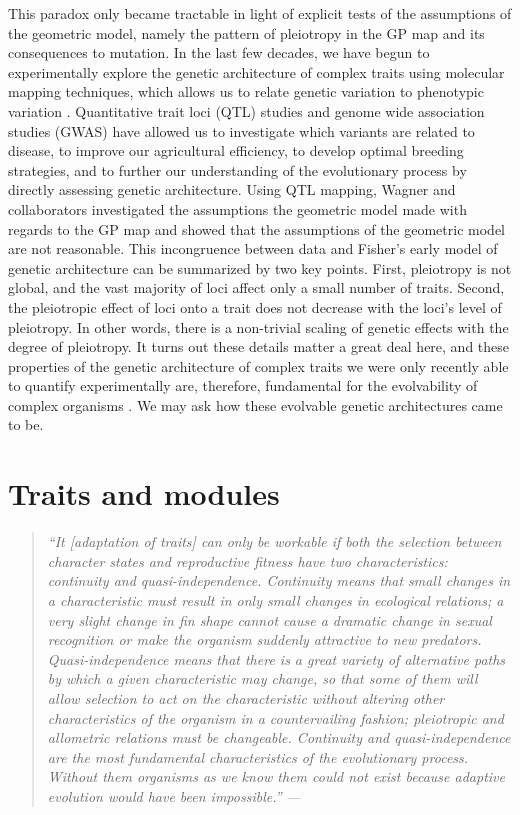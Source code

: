 \begin{refsection}
This paradox only became tractable in light of explicit tests of the
assumptions of the geometric model, namely the pattern of pleiotropy in
the GP map and its consequences to mutation. In the last few decades, we
have begun to experimentally explore the genetic architecture of complex
traits using molecular mapping techniques, which allows us to relate
genetic variation to phenotypic variation \parencite{Mackay2001-mk}.
Quantitative trait loci (QTL) studies and genome wide association
studies (GWAS) have allowed us to investigate which variants are related
to disease, to improve our agricultural efficiency, to develop optimal
breeding strategies, and to further our understanding of the
evolutionary process by directly assessing genetic architecture. Using
QTL mapping, Wagner and collaborators \parencite*{Wagner2008-oz} investigated
the assumptions the geometric model made with regards to the GP map and
showed that the assumptions of the geometric model are not reasonable.
This incongruence between data and Fisher's early model of genetic
architecture can be summarized by two key points. First, pleiotropy is
not global, and the vast majority of loci affect only a small number of
traits. Second, the pleiotropic effect of loci onto a trait does not
decrease with the loci's level of pleiotropy. In other words, there is a
non-trivial scaling of genetic effects with the degree of pleiotropy. It
turns out these details matter a great deal here, and these properties
of the genetic architecture of complex traits we were only recently able
to quantify experimentally are, therefore, fundamental for the
evolvability of complex organisms \parencite{Wagner2011-kp}. We may ask how
these evolvable genetic architectures came to be.

\section{Traits and modules}

\begin{quote}
\textit{
``It {[}adaptation of traits{]} can only be workable if both the
selection between character states and reproductive fitness have two
characteristics: continuity and quasi-independence. Continuity means
that small changes in a characteristic must result in only small changes
in ecological relations; a very slight change in fin shape cannot cause
a dramatic change in sexual recognition or make the organism suddenly
attractive to new predators. Quasi-independence means that there is a
great variety of alternative paths by which a given characteristic may
change, so that some of them will allow selection to act on the
characteristic without altering other characteristics of the organism in
a countervailing fashion; pleiotropic and allometric relations must be
changeable. Continuity and quasi-independence are the most fundamental
characteristics of the evolutionary process. Without them organisms as
we know them could not exist because adaptive evolution would have been
impossible.'' --- \textcite{Lewontin1979-iw}}
\end{quote}


\end{refsection}
